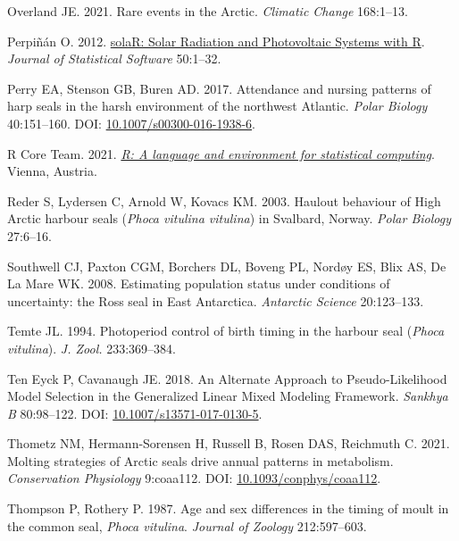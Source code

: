\documentclass[fleqn,10pt,lineno]{wlpeerj} %
\newlength{\cslhangindent}
\newenvironment{CSLReferences}[2] %
 {\begin{list}{}{%
  \setlength{\itemindent}{0pt}
  \setlength{\leftmargin}{0pt}
  \setlength{\parsep}{0pt}
  \ifodd #1
   \setlength{\leftmargin}{\cslhangindent}
   \setlength{\itemindent}{-1\cslhangindent}
  \fi
  \setlength{\itemsep}{#2\baselineskip}}}
 {\end{list}}
\begin{document}
\begin{CSLReferences}{1}{0}
Overland JE. 2021. Rare events in the Arctic. \emph{Climatic Change} 168:1--13.

Perpiñán O. 2012. \href{http://www.jstatsoft.org/v50/i09/}{solaR: Solar Radiation and Photovoltaic Systems with R}. \emph{Journal of Statistical Software} 50:1--32.

Perry EA, Stenson GB, Buren AD. 2017. Attendance and nursing patterns of harp seals in the harsh environment of the northwest Atlantic. \emph{Polar Biology} 40:151--160. DOI: \href{https://doi.org/10.1007/s00300-016-1938-6}{10.1007/s00300-016-1938-6}.

R Core Team. 2021. \emph{\href{https://www.R-project.org/}{R: A language and environment for statistical computing}}. Vienna, Austria.

Reder S, Lydersen C, Arnold W, Kovacs KM. 2003. Haulout behaviour of High Arctic harbour seals (\emph{Phoca vitulina vitulina}) in Svalbard, Norway. \emph{Polar Biology} 27:6--16.

Southwell CJ, Paxton CGM, Borchers DL, Boveng PL, Nordøy ES, Blix AS, De La Mare WK. 2008. Estimating population status under conditions of uncertainty: the Ross seal in East Antarctica. \emph{Antarctic Science} 20:123--133.

Temte JL. 1994. Photoperiod control of birth timing in the harbour seal (\emph{Phoca vitulina}). \emph{J. Zool.} 233:369--384.

Ten Eyck P, Cavanaugh JE. 2018. An Alternate Approach to Pseudo-Likelihood Model Selection in the Generalized Linear Mixed Modeling Framework. \emph{Sankhya B} 80:98--122. DOI: \href{https://doi.org/10.1007/s13571-017-0130-5}{10.1007/s13571-017-0130-5}.

Thometz NM, Hermann-Sorensen H, Russell B, Rosen DAS, Reichmuth C. 2021. Molting strategies of Arctic seals drive annual patterns in metabolism. \emph{Conservation Physiology} 9:coaa112. DOI: \href{https://doi.org/10.1093/conphys/coaa112}{10.1093/conphys/coaa112}.

Thompson P, Rothery P. 1987. Age and sex differences in the timing of moult in the common seal, \emph{Phoca vitulina}. \emph{Journal of Zoology} 212:597--603.


\end{CSLReferences}
\end{document}
